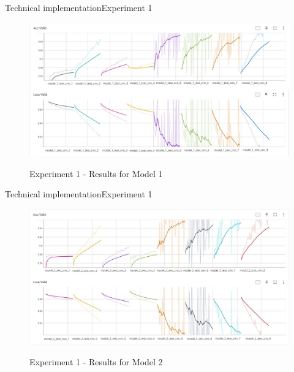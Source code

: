\documentclass[
]{beamer}
\begin{document}
\begin{frame}{Technical implementation}{Experiment 1}

\begin{center}
    \begin{figure}[!h]
        \centering
        \includegraphics[width=\textwidth]{img/exp1_acc1+loss1.jpg}
        \label{fig:exp1_mod1}
        \caption{Experiment 1 - Results for Model 1}
    \end{figure}
\end{center}

\end{frame}


\begin{frame}{Technical implementation}{Experiment 1}

\begin{center}
    \begin{figure}[!h]
        \centering
        \includegraphics[width=\textwidth]{img/exp1_acc2+loss2.jpg}
        \label{fig:exp1_mod2}
        \caption{Experiment 1 - Results for Model 2}
    \end{figure}
\end{center}

\end{frame}
\end{document}
